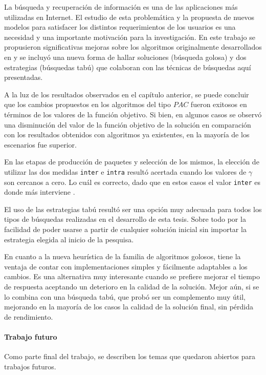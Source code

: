 La búsqueda y recuperación de información es una de las aplicaciones más utilizadas en Internet. El estudio de esta problemática y la propuesta de nuevos modelos para satisfacer los distintos requerimientos de los usuarios es una necesidad y una importante motivación para la investigación. En este trabajo se propusieron significativas mejoras sobre los algoritmos originalmente desarrollados en \cite{journals/tkde/Amer-YahiaBCFMZ14} y se incluyó una nueva forma de hallar soluciones (búsqueda golosa) y dos estrategias (búsquedas tabú) que colaboran con las técnicas de búsquedas aquí presentadas.

A la luz de los resultados observados en el capítulo anterior, se puede concluir que los cambios propuestos en los algoritmos del tipo $PAC$ fueron exitosos en términos de los valores de la función objetivo. Si bien, en algunos  casos se observó una disminución del valor de la función objetivo de la solución en comparación con los resultados obtenidos con algoritmos ya existentes, en la mayoría de los escenarios fue superior. 

En las etapas de producción de paquetes y selección de los mismos, la elección de utilizar las dos medidas \texttt{inter} e \texttt{intra} resultó acertada cuando los valores de $\gamma$ son cercanos a cero. Lo cuál es correcto, dado que en estos casos el valor \texttt{inter} es donde más interviene .

El uso de las estrategias tabú resultó ser una opción muy adecuada para todos los tipos de búsquedas realizadas en el desarrollo de esta tesis. Sobre todo por la facilidad de poder usarse a partir de cualquier solución inicial sin importar la estrategia elegida al inicio de la pesquisa.

En cuanto a la nueva heurística de la familia de algoritmos golosos, tiene la ventaja de contar con implementaciones simples y fácilmente adaptables a los cambios. Es una alternativa muy interesante cuando se prefiere mejorar el tiempo de respuesta aceptando un deterioro en la calidad de la solución. Mejor aún, si se lo combina con una búsqueda tabú, que probó ser un complemento muy útil, mejorando en la mayoría de los casos la calidad de la solución final, sin pérdida de rendimiento. 

\paragraph{Trabajo futuro} Como parte final del trabajo, se describen los temas que quedaron abiertos para trabajos futuros. 

